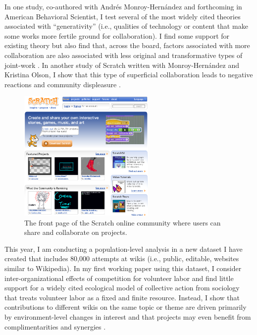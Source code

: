 \documentclass[10pt]{memoir}
\begin{document}
In one study, co-authored with Andrés Monroy-Hernández and forthcoming
in American Behavioral Scientist, I test several of the most widely
cited theories associated with ``generativity'' (i.e., qualities of
technology or content that make some works more fertile ground for
collaboration). I find some support for existing theory but also find
that, across the board, factors associated with more collaboration are
also associated with less original and transformative types of
joint-work \cite{hill_remixing_2012}. In another study of Scratch
written with Monroy-Hernández and Kristina Olson, I show that this type
of superficial collaboration leads to negative reactions and community
displeasure \cite{hill_responses_2010}.

\begin{figure}
 \begin{centering}
 \includegraphics[width=2.6in]{figures/frontpage_modified-topremix.png}
  \caption{The front page of the Scratch online community where users
    can share and collaborate on projects.}
 \label{fig:scratchfrontpage}
 \end{centering}
 \vspace{-2em}
\end{figure}

This year, I am conducting a population-level analysis in a new
dataset I have created that includes 80,000 attempts at wikis (i.e.,
public, editable, websites similar to Wikipedia). In my first working
paper using this dataset, I consider inter-organizational effects of
competition for volunteer labor and find little support for a widely
cited ecological model of collective action from sociology that treats
volunteer labor as a fixed and finite resource. Instead, I show that
contributions to different wikis on the same topic or theme are driven
primarily by environment-level changes in interest and that projects
may even benefit from complimentarities and synergies
\cite{hill_is_2012}.
\end{document}

